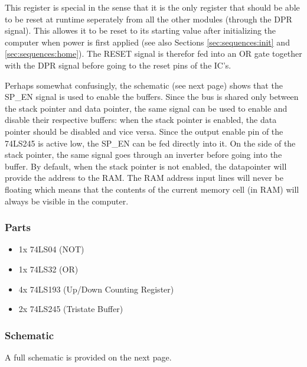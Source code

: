 This register is special in the sense that it is the only register that should be able to be reset at runtime seperately from all the other modules (through the DPR signal). This allowes it to be reset to its starting value after initializing the computer when power is first applied (see also Sections \ref{sec:sequences:init} and \ref{sec:sequences:home}). The RESET signal is therefor fed into an OR gate together with the DPR signal before going to the reset pins of the IC's.

Perhaps somewhat confusingly, the schematic (see next page) shows that the SP\_EN signal is used to enable the buffers. Since the bus is shared only between the stack pointer and data pointer, the same signal can be used to enable and disable their respective buffers: when the stack pointer is enabled, the data pointer should be disabled and vice versa. Since the output enable pin of the 74LS245 is active low, the SP\_EN can be fed directly into it. On the side of the stack pointer, the same signal goes through an inverter before going into the buffer. By default, when the stack pointer is not enabled, the datapointer will provide the address to the RAM. The RAM address input lines will never be floating which means that the contents of the current memory cell (in RAM) will always be visible in the computer.

\subsubsection*{Parts}
\begin{itemize}\itemsep0em
\item 1x 74LS04 (NOT)
\item 1x 74LS32 (OR)
\item 4x 74LS193 (Up/Down Counting Register)
\item 2x 74LS245 (Tristate Buffer)
\end{itemize}


\subsubsection*{Schematic}
A full schematic is provided on the next page.




